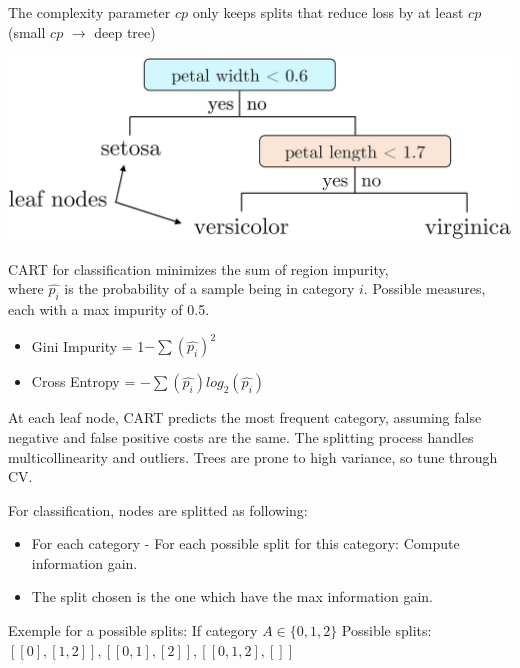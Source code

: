 \documentclass[10pt,landscape]{article}
\begin{document}
\begin{multicols}{3}
    The complexity parameter $cp$ only keeps splits that reduce loss by at least $cp$ (small $cp$ $\to$ deep tree)
    \smallskip
    \begin{center}
        \vspace{-1mm}
        \includegraphics[scale = .08]{images/CART.JPG}
    \end{center}
    \vspace{-2mm}
    CART for classification minimizes the sum of region impurity, \\
    where $\hat{p_i}$ is the probability of a sample being in category $i$.
    Possible measures, each with a max impurity of 0.5.
    \begin{itemize}[label={--},leftmargin=4mm]
        \vspace{-1mm}
        \itemsep -.4mm
        \item Gini Impurity = 1$ - \sum (\hat{p_i})^2$
        \item Cross Entropy = $-\sum (\hat{p_i}) log_2(\hat{p_i})$
    \end{itemize}
    At each leaf node, CART predicts the most frequent category, assuming false negative and false positive costs are the same. The splitting process handles multicollinearity and outliers. Trees are prone to high variance, so tune through CV.

    \vspace{+1mm}
    For classification, nodes are splitted as following:
    \begin{itemize}[label={--},leftmargin=4mm]
        \vspace{-1mm}
        \itemsep -.4mm
        \item For each category
              \subitem - For each possible split for this category:
              Compute information gain.
        \item The split chosen is the one which have the max information gain.
    \end{itemize}


    Exemple for a possible splits:
    If category $A\in \{0,1,2\}$
    Possible splits:
    $[[0],[1,2]], [[0,1],[2]], [[0,1,2],[]]$



\end{multicols}
\end{document}
